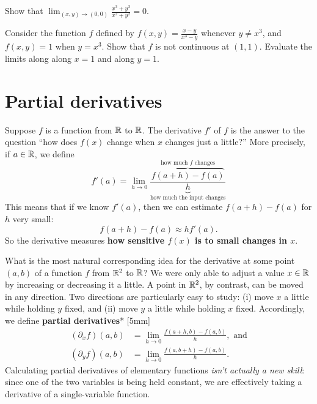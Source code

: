 \documentclass{watsonbook}
\begin{document}
\begin{exercise}{}{}
  Show that $\displaystyle{\lim_{(x,y) \to (0,0)} \frac{x^3 + y^3}{x^2 + y^2}} =
  0$. 
\end{exercise}

\begin{exercise}{}{}
  Consider the function $f$ defined by $f(x,y) = \frac{x-y}{x^3-y}$
  whenever $y \neq x^3$, and $f(x,y) = 1$ when $y = x^3$. Show that
  $f$ is not continuous at $(1,1)$. Evaluate the limits along along
  $x=1$ and along $y=1$.
\end{exercise}

\section{Partial derivatives} \label{sec:partial}



Suppose $f$ is a function from $\mathbb{R}$ to $\mathbb{R}$. The derivative $f'$ of
$f$ is the answer to the question ``how does $f(x)$ change when $x$
changes just a little?'' More precisely, if $a\in \mathbb{R}$, we define
\[
  f'(a) = \lim_{h \to 0} \frac{\overbrace{f(a+h)-f(a)}^{\text{how
        much $f$ changes}}}{\underbrace{h}_{\text{how much the input
        changes}}}
\]
This means that if we know $f'(a)$, then we can estimate
$f(a+h) - f(a)$ for $h$ very small:
\[
  f(a+h) - f(a) \approx h
  f'(a). 
\]
So the derivative measures \textbf{how sensitive $f(x)$ is to small
  changes in $x$}.

What is the most natural corresponding idea for the derivative at some
point $(a,b)$ of a function $f$ from $\mathbb{R}^2$ to $\mathbb{R}$? We were only able
to adjust a value $x\in \mathbb{R}$ by increasing or decreasing it a little. A
point in $\mathbb{R}^2$, by contrast, can be moved in any direction. Two
directions are particularly easy to study: (i) move $x$ a little while
holding $y$ fixed, and (ii) move $y$ a little while holding $x$
fixed. Accordingly, we define \textbf{partial derivatives}*
[5mm]
\begin{align*}
  (\partial_x f)(a,b) &= \lim_{h \to 0}\frac{f(a+h,b) - f(a,b)}{h},
                        \text{ and} \\
  (\partial_y f)(a,b) &= \lim_{h \to 0}\frac{f(a,b+h) - f(a,b)}{h}. 
\end{align*}
Calculating partial derivatives of elementary functions \textit{isn't
  actually a new skill}: since one of the two
variables is being held constant, we are effectively taking a
derivative of a single-variable function.
\end{document}
